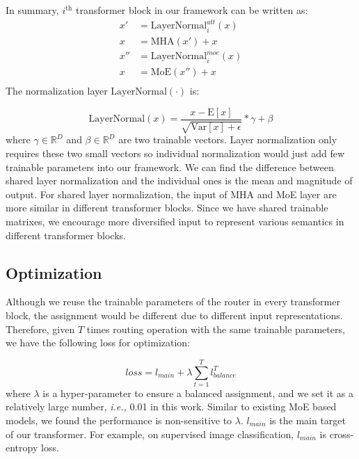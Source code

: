 \documentclass[letterpaper]{article} %
\newcommand{\ie}{\emph{i.e.,}\xspace}
\begin{document}
In summary, $i^{\mathrm{th}}$ transformer block in our framework can be written as:
\begin{equation}
\begin{aligned}
x' &= \mathrm{LayerNormal}^{att}_{i}(x) \\
x &= \mathrm{MHA}(x') + x\\
x''&= \mathrm{LayerNormal}^{moe}_{i}(x) \\
x &= \mathrm{MoE}(x'') + x\\
\end{aligned}
\end{equation}
The normalization layer $ \mathrm{LayerNormal}(\cdot)$ is:

\begin{equation}\label{eq:layer_norm}
\mathrm{LayerNormal}(x)=\frac{x-\mathrm{E}[x]}{\sqrt{\mathrm{Var}[x]+\epsilon}}*\gamma + \beta 
\end{equation}
where $\gamma \in \mathbb{R}^D$ and $\beta \in \mathbb{R}^D$ are two trainable vectors. Layer normalization only requires these two small vectors so individual normalization would just add few trainable parameters into our framework. We can find the difference between shared layer normalization and the individual ones is the mean and magnitude of output. For shared layer normalization, the input of MHA and MoE layer are more similar in different transformer blocks. Since we have shared trainable matrixes, we encourage more diversified input to represent various semantics in different transformer blocks. 


\subsection{Optimization}


Although we reuse the trainable parameters of the router in every transformer block, the assignment would be different due to different input representations. Therefore, given $T$ times routing operation with the same trainable parameters, we have the following loss for optimization:

\begin{equation}
loss=l_{main} + \lambda \sum_{t=1}^T l_{balance}^T
\end{equation}
where $\lambda$ is a hyper-parameter to ensure a balanced assignment, and we set it as a relatively large number, \ie 0.01 in this work. Similar to existing MoE based models, we found the performance is non-sensitive to $\lambda$. $l_{main}$ is the main target of our transformer. For example, on supervised image classification, $l_{main}$ is cross-entropy loss.
\end{document}
